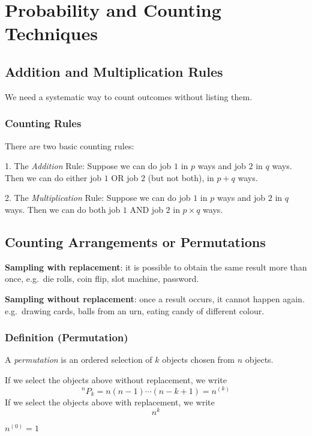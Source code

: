 \chapter{Probability and Counting Techniques}
\section{Addition and Multiplication Rules}

We need a systematic way to count outcomes without listing them.

\begin{defbox}
    \subsection{Counting Rules}
    There are two basic counting rules:

    1. The \emph{Addition} Rule:
    Suppose we can do job $1$ in $p$ ways and job $2$ in $q$ ways.
    Then we can do either job $1$ OR job $2$ (but not both), in $p + q$ ways.

    2. The \emph{Multiplication} Rule:
    Suppose we can do job $1$ in $p$ ways and job $2$ in $q$ ways.
    Then we can do both job $1$ AND job $2$ in $p \times q$ ways.
\end{defbox}

\section{Counting Arrangements or Permutations}

\textbf{Sampling with replacement}: it is possible to obtain
the same result more than once, e.g.\ die rolls, coin flip, slot machine, password.

\textbf{Sampling without replacement}: once a result occurs, it cannot happen again.
e.g.\ drawing cards, balls from an urn, eating candy of different colour.

\begin{defbox}
    \subsection{Definition (Permutation)}
    A \emph{permutation} is an ordered selection of $ k $
    objects chosen from $ n $ objects.

    If we select the objects above without replacement, we write
    \[ ^n P_k =n(n-1)\cdots(n-k+1)=n^{(k)} \]
    If we select the objects above with replacement, we write
    \[ n^k \]
\end{defbox}
$ n^{(0)}=1 $

